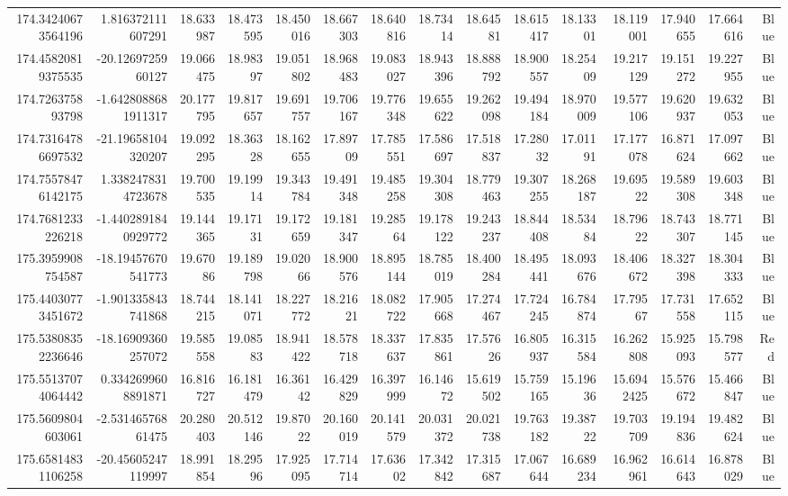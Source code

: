 \begin{center}
\begin{longtable}{rrrrrrrrrrrrrrr}
174.34240673564196 & 1.816372111607291 & 18.633987 & 18.473595 & 18.450016 & 18.667303 & 18.640816 & 18.73414 & 18.64581 & 18.615417 & 18.13301 & 18.119001 & 17.940655 & 17.664616 & Blue \\
174.45820819375535 & -20.1269725960127 & 19.066475 & 18.98397 & 19.051802 & 18.968483 & 19.083027 & 18.943396 & 18.888792 & 18.900557 & 18.25409 & 19.217129 & 19.151272 & 19.227955 & Blue \\
174.726375893798 & -1.6428088681911317 & 20.177795 & 19.817657 & 19.691757 & 19.706167 & 19.776348 & 19.655622 & 19.262098 & 19.494184 & 18.970009 & 19.577106 & 19.620937 & 19.632053 & Blue \\
174.73164786697532 & -21.19658104320207 & 19.092295 & 18.36328 & 18.162655 & 17.89709 & 17.785551 & 17.586697 & 17.518837 & 17.28032 & 17.01191 & 17.177078 & 16.871624 & 17.097662 & Blue \\
174.75578476142175 & 1.3382478314723678 & 19.700535 & 19.19914 & 19.343784 & 19.491348 & 19.485258 & 19.304308 & 18.779463 & 19.307255 & 18.268187 & 19.69522 & 19.589308 & 19.603348 & Blue \\
174.7681233226218 & -1.4402891840929772 & 19.144365 & 19.17131 & 19.172659 & 19.181347 & 19.28564 & 19.178122 & 19.243237 & 18.844408 & 18.53484 & 18.79622 & 18.743307 & 18.771145 & Blue \\
175.3959908754587 & -18.19457670541773 & 19.67086 & 19.189798 & 19.02066 & 18.900576 & 18.895144 & 18.785019 & 18.400284 & 18.495441 & 18.093676 & 18.406672 & 18.327398 & 18.304333 & Blue \\
175.44030773451672 & -1.901335843741868 & 18.744215 & 18.141071 & 18.227772 & 18.21621 & 18.082722 & 17.905668 & 17.274467 & 17.724245 & 16.784874 & 17.79567 & 17.731558 & 17.652115 & Blue \\
175.53808352236646 & -18.16909360257072 & 19.585558 & 19.08583 & 18.941422 & 18.578718 & 18.337637 & 17.835861 & 17.57626 & 16.805937 & 16.315584 & 16.262808 & 15.925093 & 15.798577 & Red \\
175.55137074064442 & 0.3342699608891871 & 16.816727 & 16.181479 & 16.36142 & 16.429829 & 16.397999 & 16.14672 & 15.619502 & 15.759165 & 15.19636 & 15.6942425 & 15.576672 & 15.466847 & Blue \\
175.5609804603061 & -2.53146576861475 & 20.280403 & 20.512146 & 19.87022 & 20.160019 & 20.141579 & 20.031372 & 20.021738 & 19.763182 & 19.38722 & 19.703709 & 19.194836 & 19.482624 & Blue \\
175.65814831106258 & -20.45605247119997 & 18.991854 & 18.29596 & 17.925095 & 17.714714 & 17.63602 & 17.342842 & 17.315687 & 17.067644 & 16.689234 & 16.962961 & 16.614643 & 16.878029 & Blue \\

\end{longtable}
\end{center}
